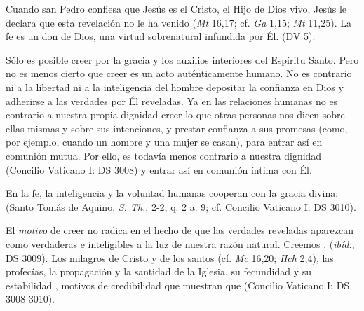 \begin{ccebody}

 Cuando san Pedro confiesa que Jesús es el Cristo, el Hijo de Dios vivo, Jesús le declara que esta revelación no le ha venido  (\textit{Mt} 16,17; cf. \textit{Ga} 1,15; \textit{Mt} 11,25). La fe es un don de Dios, una virtud sobrenatural infundida por Él.  (DV 5).


 Sólo es posible creer por la gracia y los auxilios interiores del Espíritu Santo. Pero no es menos cierto que creer es un acto auténticamente humano. No es contrario ni a la libertad ni a la inteligencia del hombre depositar la confianza en Dios y adherirse a las verdades por Él reveladas. Ya en las relaciones humanas no es contrario a nuestra propia dignidad creer lo que otras personas nos dicen sobre ellas mismas y sobre sus intenciones, y prestar confianza a sus promesas (como, por ejemplo, cuando un hombre y una mujer se casan), para entrar así en comunión mutua. Por ello, es todavía menos contrario a nuestra dignidad  (Concilio Vaticano I: DS 3008) y entrar así en comunión íntima con Él.

 En la fe, la inteligencia y la voluntad humanas cooperan con la gracia divina:  (Santo Tomás de Aquino, \textit{S. Th.}, 2-2, q. 2 a. 9; cf. Concilio Vaticano I: DS 3010).

\newpage
{}

 El \textit{motivo} de creer no radica en el hecho de que las verdades reveladas aparezcan como verdaderas e inteligibles a la luz de nuestra razón natural. Creemos .  (\textit{ibíd.}, DS 3009). Los milagros de Cristo y de los santos (cf. \textit{Mc} 16,20; \textit{Hch} 2,4), las profecías, la propagación y la santidad de la Iglesia, su fecundidad y su estabilidad , motivos de credibilidad que muestran que  (Concilio Vaticano I: DS 3008-3010).


\end{ccebody}
